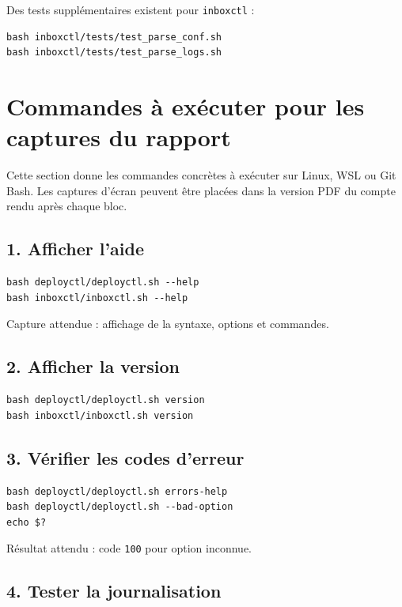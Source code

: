 \documentclass[12pt,a4paper]{article}
\begin{document}
Des tests supplémentaires existent pour \texttt{inboxctl} :

\begin{lstlisting}
bash inboxctl/tests/test_parse_conf.sh
bash inboxctl/tests/test_parse_logs.sh
\end{lstlisting}

\section{Commandes à exécuter pour les captures du rapport}

Cette section donne les commandes concrètes à exécuter sur Linux, WSL ou Git Bash. Les captures d'écran peuvent être placées dans la version PDF du compte rendu après chaque bloc.

\subsection{1. Afficher l'aide}

\begin{lstlisting}
bash deployctl/deployctl.sh --help
bash inboxctl/inboxctl.sh --help
\end{lstlisting}

Capture attendue : affichage de la syntaxe, options et commandes.

\subsection{2. Afficher la version}

\begin{lstlisting}
bash deployctl/deployctl.sh version
bash inboxctl/inboxctl.sh version
\end{lstlisting}

\subsection{3. Vérifier les codes d'erreur}

\begin{lstlisting}
bash deployctl/deployctl.sh errors-help
bash deployctl/deployctl.sh --bad-option
echo $?
\end{lstlisting}

Résultat attendu : code \texttt{100} pour option inconnue.

\subsection{4. Tester la journalisation}
\end{document}
